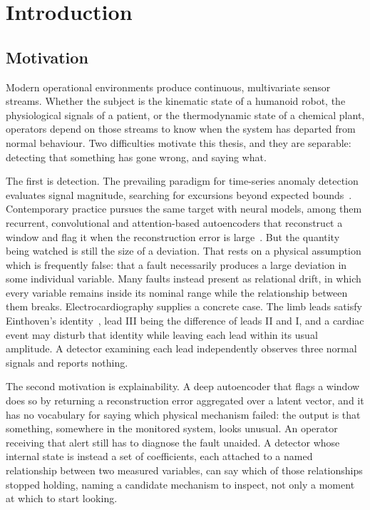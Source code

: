 \chapter{Introduction}
\label{ch:introduction}

\section{Motivation}
\label{sec:motivation}

Modern operational environments produce continuous, multivariate sensor streams. Whether the subject is the kinematic state of a humanoid robot, the physiological signals of a patient, or the thermodynamic state of a chemical plant, operators depend on those streams to know when the system has departed from normal behaviour. Two difficulties motivate this thesis, and they are separable: detecting that something has gone wrong, and saying what.

The first is detection. The prevailing paradigm for time-series anomaly detection evaluates signal magnitude, searching for excursions beyond expected bounds~\cite{chandola2009survey,blazquezgarcia2021review}. Contemporary practice pursues the same target with neural models, among them recurrent, convolutional and attention-based autoencoders that reconstruct a window and flag it when the reconstruction error is large~\cite{malhotra2016lstmad,su2019omnianomaly,audibert2020usad}. But the quantity being watched is still the size of a deviation. That rests on a physical assumption which is frequently false: that a fault necessarily produces a large deviation in some individual variable. Many faults instead present as relational drift, in which every variable remains inside its nominal range while the relationship between them breaks. Electrocardiography supplies a concrete case. The limb leads satisfy Einthoven's identity~\cite{malmivuo1995bioelectromagnetism}, lead III being the difference of leads II and I, and a cardiac event may disturb that identity while leaving each lead within its usual amplitude. A detector examining each lead independently observes three normal signals and reports nothing.

The second motivation is explainability. A deep autoencoder that flags a window does so by returning a reconstruction error aggregated over a latent vector, and it has no vocabulary for saying which physical mechanism failed: the output is that something, somewhere in the monitored system, looks unusual. An operator receiving that alert still has to diagnose the fault unaided. A detector whose internal state is instead a set of coefficients, each attached to a named relationship between two measured variables, can say which of those relationships stopped holding, naming a candidate mechanism to inspect, not only a moment at which to start looking.

